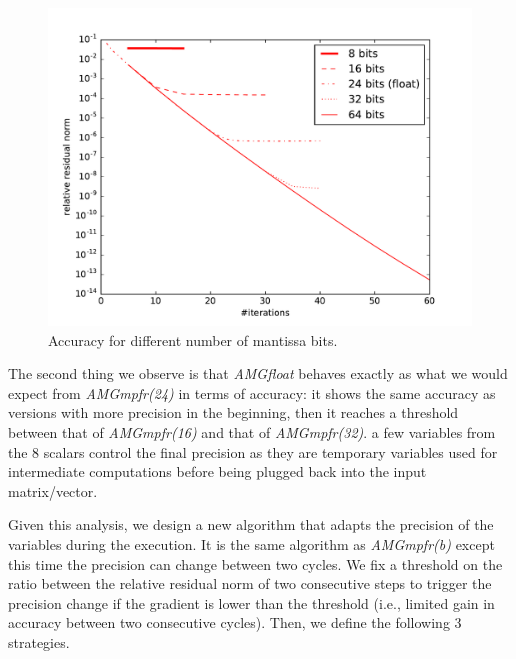 \begin{figure}[htb]
    \centering
    \includegraphics[width=0.9\linewidth]{figs/bits_convergence.pdf}
    \caption{Accuracy for different number of mantissa bits.}
    \label{fig.bits_accuracy}
\end{figure}

The second thing we observe is that \emph{AMGfloat}  behaves exactly as what we would expect from
\emph{AMGmpfr(24)} in terms of accuracy: it shows the same accuracy as versions
with more precision in the beginning, then it reaches a threshold between that
of \emph{AMGmpfr(16)} and that of \emph{AMGmpfr(32)}.  a few
variables from the 8 scalars control the final precision as they are temporary
variables used for intermediate computations before being plugged back into the
input matrix/vector.

Given this analysis, we design a new algorithm that adapts the precision of the
variables during the execution. It is the same algorithm as \emph{AMGmpfr(b)}
except this time the precision can change between two cycles.  We fix a
threshold on the ratio between the relative residual norm of two consecutive
steps to trigger the precision change if the gradient is lower than the
threshold (i.e., limited gain in accuracy between two consecutive cycles). Then,
we define the following 3 strategies.

